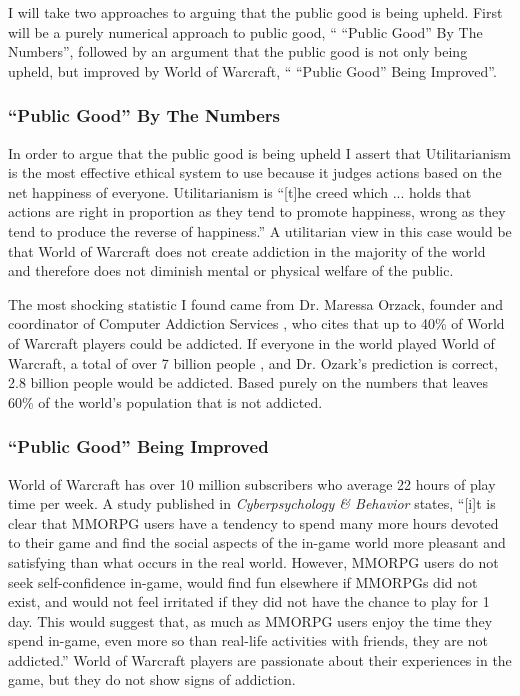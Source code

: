 \documentclass[11pt]{article}
\begin{document}
\begin{multicols}{2}
I will take two approaches to arguing that the public good is being upheld. First will be a purely numerical approach to public good, `` ``Public Good'' By The Numbers'', followed by an argument that the public good is not only being upheld, but improved by World of Warcraft, `` ``Public Good'' Being Improved''.

\subsubsection{``Public Good'' By The Numbers}
In order to argue that the public good is being upheld I assert that Utilitarianism is the most effective ethical system to use because it judges actions based on the net happiness of everyone. Utilitarianism is ``[t]he creed which ... holds that actions are right in proportion as they tend to promote happiness, wrong as they tend to produce the reverse of happiness.'' \cite{Utilitarianism} A utilitarian view in this case would be that World of Warcraft does not create addiction in the majority of the world and therefore does not diminish mental or physical welfare of the public.

The most shocking statistic I found came from Dr. Maressa Orzack, founder and coordinator of Computer Addiction Services \cite{CompAddictionServices}, who cites that up to 40\% of World of Warcraft players could be addicted. \cite{FortyPercentAddicted} If everyone in the world played World of Warcraft, a total of over 7 billion people \cite{WorldPopulation}, and Dr. Ozark's prediction is correct, 2.8 billion people would be addicted. Based purely on the numbers that leaves 60\% of the world's population that is not addicted.

\subsubsection{``Public Good'' Being Improved}
World of Warcraft has over 10 million subscribers \cite{WoWPlayerCount} who average 22 hours of play time per week. \cite{PlayerMotivations} A study published in \emph{Cyberpsychology \& Behavior} \cite{ExcessiveUseForSocialAspects} states, ``[i]t is clear that MMORPG users have a tendency to spend many more hours devoted to their game and find the social aspects of the in-game world more pleasant and satisfying than what occurs in the real world. However, MMORPG users do not seek self-confidence in-game, would find fun elsewhere if MMORPGs did not exist, and would not feel irritated if they did not have the chance to play for 1 day. This would suggest that, as much as MMORPG users enjoy the time they spend in-game, even more so than real-life activities with friends, they are not addicted.'' World of Warcraft players are passionate about their experiences in the game, but they do not show signs of addiction.


\end{multicols}
\end{document}
